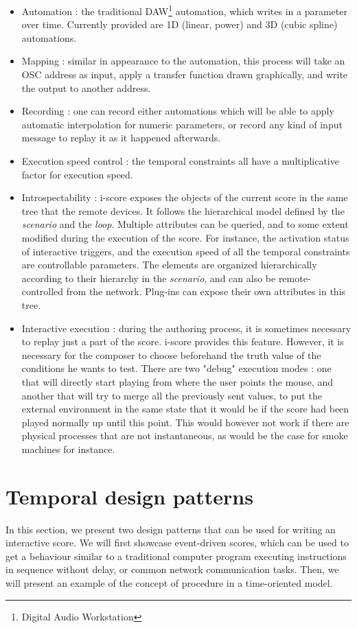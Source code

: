 \documentclass{article}
\newcommand{\scenario}{\textit{scenario}\xspace}
\newcommand{\Loop}{\textit{loop}\xspace}
\begin{document}
\begin{itemize}
\item Automation : the traditional DAW\footnote{Digital Audio Workstation} automation, which writes in a parameter over time. 
Currently provided are 1D (linear, power) and 3D (cubic spline) automations.
\item Mapping : similar in appearance to the automation, this process will take an OSC address as input, apply a transfer function drawn graphically, and write the output to another address.
\item Recording : one can record either automations which will be able to apply automatic interpolation for numeric parameters, or record any kind of input message to replay it as it happened afterwards.
\item Execution speed control : the temporal constraints all have a multiplicative factor for execution speed.
\item Introspectability : i-score exposes the objects of the current score in the same tree that the remote devices. 
It follows the hierarchical model defined by the \scenario and the \Loop.
Multiple attributes can be queried, and to some extent modified during the execution of the score. 
For instance, the activation status of interactive triggers, and the execution speed of all the temporal constraints are controllable parameters.
The elements are organized hierarchically according to their hierarchy in the \scenario, and can also be remote-controlled from the network.
Plug-ins can expose their own attributes in this tree.
\item Interactive execution : during the authoring process, it is sometimes necessary to replay just a part of the score.
i-score provides this feature. 
However, it is necessary for the composer to choose beforehand the truth value of the conditions he wants to test.
There are two "debug" execution modes : one that will directly start playing from where the user points the mouse, and another that will try to merge all the previously sent values, to put the external environment in the same state that it would be if the score had been played normally up until this point. 
This would however not work if there are physical processes that are not instantaneous, as would be the case for smoke machines for instance.
\end{itemize}

\section{Temporal design patterns}
In this section, we present two design patterns that can be used 
for writing an interactive score.
We will first showcase event-driven scores, which can be used to get a behaviour 
similar to a traditional computer program executing instructions in sequence without delay, or common network communication tasks.
Then, we will present an example of the concept of procedure in a time-oriented model.
\end{document}
